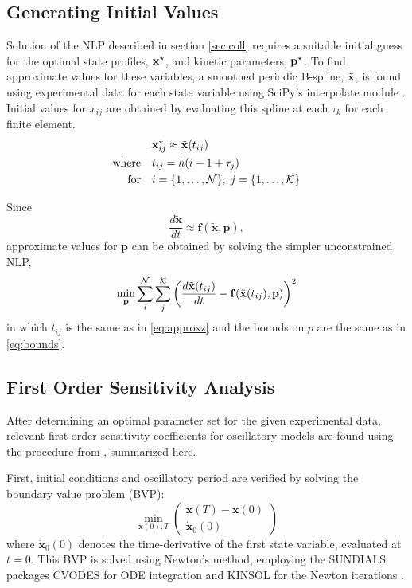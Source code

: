 \subsection{Generating Initial Values}

Solution of the NLP described in section \ref{sec:coll} requires a suitable
initial guess for the optimal state profiles, ${\mathbf{x}}^\star$, and kinetic parameters,
${\mathbf{p}}^\star$.  To find approximate values for these variables, a smoothed periodic
B-spline, $\tilde{\mathbf{x}}$, is found using experimental data for each state variable
using SciPy's interpolate module \cite{Jones}. Initial values for $x_{ij}$ are
obtained by evaluating this spline at each $\tau_k$ for each finite element.
\begin{equation} \label{eq:approxz}
  \begin{aligned} &{\mathbf{x}}^\star_{ij} \approx \tilde{\mathbf{x}}(t_{ij}) \\ 
    \textrm{where} \quad & t_{ij} = h(i - 1 + \tau_j) \\
    \textrm{for} \quad & i = \{1,\ldots,{\cal N}\},\; j = \{1,\ldots,{\cal K}\}
  \end{aligned}
\end{equation}

Since
\begin{equation}
  \frac{d\tilde{\bm x}}{dt} \approx {\bm f}(\tilde{\bm x},{\bm p}),
\end{equation}
approximate values for $\bm p$ can be obtained by solving the simpler unconstrained
NLP,
\begin{equation}
  \min_{\mathbf{p}} \sum_i^{{\cal N}}\sum_j^{{\cal
  K}}\left(\frac{d\tilde{\mathbf{x}}(t_{ij})}{dt} -
  {\mathbf{f}}(\tilde{\mathbf{x}}(t_{ij}),{\mathbf{p}})\right)^2
\end{equation}
in which $t_{ij}$ is the same as in \ref{eq:approxz} and the bounds on $p$ are
the same as in \ref{eq:bounds}.

\subsection{First Order Sensitivity Analysis}

After determining an optimal parameter set for the given experimental data,
relevant first order sensitivity coefficients for oscillatory models are found
using the procedure from \cite{Wilkins2009}, summarized here.

First, initial conditions and oscillatory period are verified by solving the
boundary value problem (BVP):
\begin{equation} \label{eq:bvp}
  \min_{{\bm x}(0),T} \left(\begin{array}{c} {\bm x}(T) - {\bm x}(0) \\ \dot{{\bm x}}_0(0)
  \end{array}\right)     
\end{equation} where $\dot{{\bm x}}_0(0)$ denotes the time-derivative of the first
state variable, evaluated at $t=0$. This BVP is solved using Newton's method,
employing the SUNDIALS packages CVODES for ODE integration and KINSOL for the
Newton iterations \cite{Hindmarsh2005}.
 
